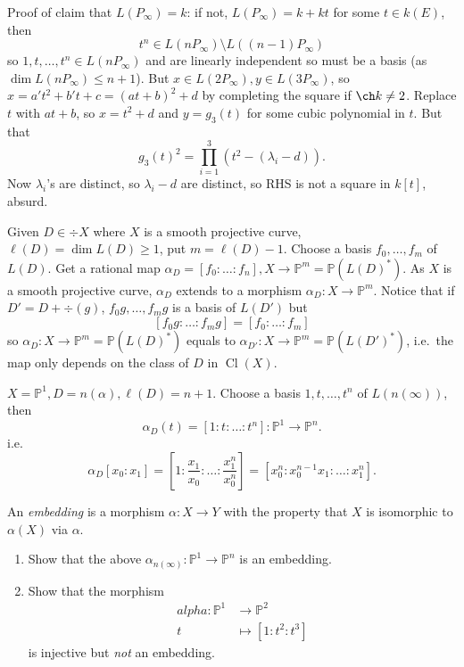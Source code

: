 \documentclass[a4paper]{article}
\DeclareMathOperator{\Cl}{Cl}
\renewcommand*{\P}{\mathbb{P}}
\begin{document}
\begin{eg}
  Proof of claim that \(L(P_\infty) = k\): if not, \(L(P_\infty) = k + kt\) for some \(t \in k(E)\), then
  \[
    t^n \in L(nP_\infty) \setminus L((n - 1)P_\infty)
  \]
  so \(1, t, \dots, t^n \in L(nP_\infty)\) and are linearly independent so must be a basis (as \(\dim L(nP_\infty) \leq n + 1\)). But \(x \in L(2P_\infty), y \in L(3P_\infty)\), so \(x = a't^2 + b't + c = (at + b)^2 + d\) by completing the square if \(\ch k \neq 2\). Replace \(t\) with \(at + b\), so \(x = t^2 + d\) and \(y = g_3(t)\) for some cubic polynomial in \(t\). But that
  \[
    g_3(t)^2 = \prod_{i = 1}^3 (t^2 - (\lambda_i - d)).
  \]
  Now \(\lambda_i\)'s are distinct, so \(\lambda_i - d\) are distinct, so RHS is not a square in \(k[t]\), absurd.
\end{eg}

Given \(D \in \div X\) where \(X\) is a smooth projective curve, \(\ell(D) = \dim L(D) \geq 1\), put \(m = \ell (D) - 1\). Choose a basis \(f_0, \dots, f_m\) of \(L(D)\). Get a rational map \(\alpha_D = [f_0: \dots: f_n], X \to \P^m = \P(L(D)^*)\). As \(X\) is a smooth projective curve, \(\alpha_D\) extends to a morphism \(\alpha_D: X \to \P^m\). Notice that if \(D' = D + \div(g)\), \(f_0g, \dots, f_mg\) is a basis of \(L(D')\) but
\[
  [f_0g: \dots: f_mg] = [f_0: \dots: f_m]
\]
so \(\alpha_D: X \to \P^m = \P(L(D)^*)\) equals to \(\alpha_{D'}: X \to \P^m = \P(L(D')^*)\), i.e.\ the map only depends on the class of \(D\) in \(\Cl(X)\).

\begin{eg}
  \(X = \P^1, D = n(\alpha), \ell(D) = n + 1\). Choose a basis \(1, t, \dots, t^n\) of \(L(n(\infty))\), then
  \[
    \alpha_D(t) = [1:t: \dots: t^n]: \P^1 \to \P^n.
  \]
  i.e.
  \[
    \alpha_D[x_0: x_1] = [1: \frac{x_1}{x_0}: \dots: \frac{x_1^n}{x_0^n}] = [x_0^n: x_0^{n - 1}x_1: \dots: x_1^n].
  \]
\end{eg}

\begin{definition}[Embedding]
  An \emph{embedding} is a morphism \(\alpha: X \to Y\) with the property that \(X\) is isomorphic to \(\alpha(X)\) via \(\alpha\).
\end{definition}

\begin{ex}\leavevmode
  \begin{enumerate}
  \item Show that the above \(\alpha_{n(\infty)}: \P^1 \to \P^n\) is an embedding.
  \item Show that the morphism
    \begin{align*}
      alpha: \P^1 &\to \P^2 \\
      t &\mapsto [1: t^2: t^3]
    \end{align*}
    is injective but \emph{not} an embedding.
  \end{enumerate}
\end{ex}
\end{document}
